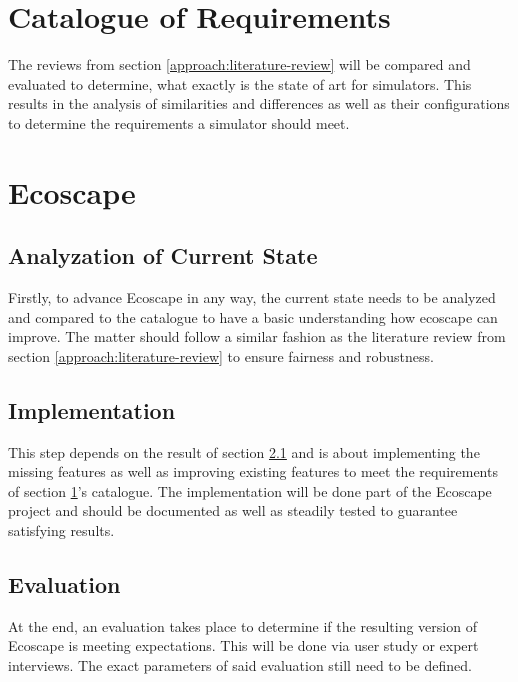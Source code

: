 \section{Catalogue of Requirements}\label{approach:catalogue}
The reviews from section \ref{approach:literature-review} will be compared and evaluated to determine, what exactly is the state of art for simulators.
This results in the analysis of similarities and differences as well as their configurations to determine the requirements a simulator should meet.

\section{Ecoscape}\label{approach:ecoscape}
\subsection{Analyzation of Current State}\label{approach:ecoscape-current}
Firstly, to advance Ecoscape in any way, the current state needs to be analyzed and compared to the catalogue to have a basic understanding how ecoscape can improve.
The matter should follow a similar fashion as the literature review from section \ref{approach:literature-review} to ensure fairness and robustness.

\subsection{Implementation}\label{approach:ecoscape-impl}
This step depends on the result of section \ref{approach:ecoscape-current} and is about implementing the missing features as well as improving existing features to meet the requirements of section \ref{approach:catalogue}'s catalogue.
The implementation will be done part of the Ecoscape project and should be documented as well as steadily tested to guarantee satisfying results.

\subsection{Evaluation}\label{approach:ecoscape-eval}
At the end, an evaluation takes place to determine if the resulting version of Ecoscape is meeting expectations. This will be done via user study or expert interviews.
The exact parameters of said evaluation still need to be defined.

